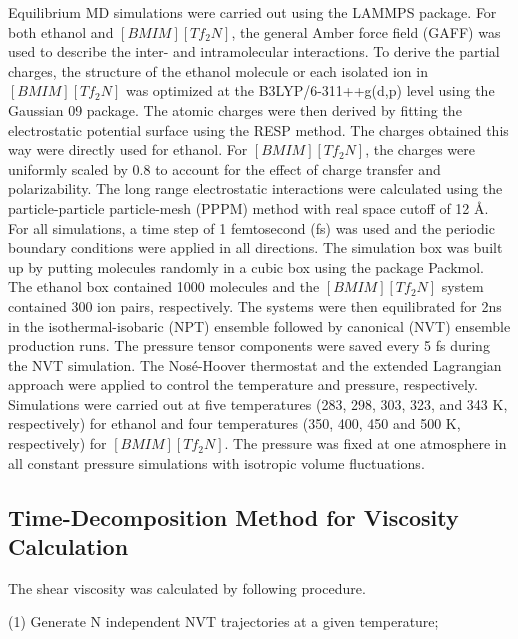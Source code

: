 \documentclass[12pt]{article}
\begin{document}
Equilibrium MD simulations were carried out using the LAMMPS package. \cite{lammps}
For both ethanol and $[BMIM][Tf_2N]$,
the general Amber force field (GAFF) \cite{Case.JCC.25.1157.2004}
was used to describe the inter- and intramolecular interactions.
To derive the partial charges,
the structure of the ethanol molecule or each isolated ion in $[BMIM][Tf_2N]$ was optimized at the B3LYP/6-311++g(d,p) level
using the Gaussian 09 package.
\cite{g09}
The atomic charges were then derived by fitting the electrostatic potential surface
using the RESP method.
\cite{RESP}
The charges obtained this way were directly used for ethanol.
For $[BMIM][Tf_2N]$, the charges were uniformly scaled by 0.8 to account for the effect of charge transfer and polarizability.
\cite{Maginn.JPCB.116.10036.2012}
The long range electrostatic interactions were calculated using the particle-particle particle-mesh (PPPM) method\cite{pppm}
with real space cutoff of 12 \AA.
For all simulations,
a time step of 1 femtosecond (fs) was used and the periodic boundary conditions were applied in all directions.
The simulation box was built up by putting molecules randomly in a cubic box using the package Packmol.
\cite{Martinez.JCC.24.819.2003,
Martinez.JCC.30.2157.2009}
The ethanol box contained 1000 molecules and the $[BMIM][Tf_2N]$ system contained 300 ion pairs, respectively.
The systems were then equilibrated for 2ns in the isothermal-isobaric (NPT) ensemble
followed by canonical (NVT) ensemble production runs.
The pressure tensor components were saved every 5 fs during the NVT simulation.
The Nos\'e-Hoover thermostat
\cite{Nose-Hoover.PRA.31.1695.1985}
and the extended Lagrangian approach
\cite{Shinoda.PR.B.69.134103}
were applied to control the temperature and pressure, respectively.
Simulations were carried out at five temperatures (283, 298, 303, 323, and 343 K, respectively) for ethanol
and four temperatures (350, 400, 450 and 500 K, respectively) for $[BMIM][Tf_2N]$.
The pressure was fixed at one atmosphere in all constant pressure simulations
with isotropic volume fluctuations.


\subsection{Time-Decomposition Method for Viscosity Calculation}

The shear viscosity was calculated by following procedure.

(1) Generate N independent NVT trajectories at a given temperature;
\end{document}
